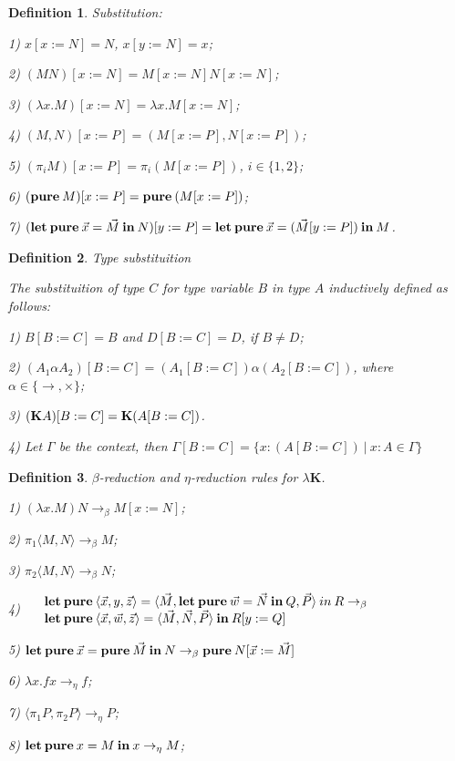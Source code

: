 \documentclass[a4paper]{article}
\newtheorem{defin}{Definition}
\begin{document}
  \begin{defin} Substitution:

  1) $x [x := N] = N$, $x [y := N] = x$;

  2) $(M N) [x := N] = M[x := N] N [x := N]$;

  3) $(\lambda x. M) [x := N] = \lambda x. M [x := N]$;

  4) $(M, N)[x := P] = (M[x := P], N [x := P])$;

  5) $(\pi_i M) [x := P] = \pi_i (M[x := P])$, $i \in \{ 1, 2\}$;

  6) $({\bf pure \: } M) [x := P] = {\bf pure \: } (M [x := P])$;

  7) $({\bf let \: pure \:}\vec{x} = \vec{M} {\: \bf in \:} N) [y := P] = {\bf let \: pure \:} \vec{x} = (\vec{M} [y := P]) {\: \bf in \:} M$.
  \end{defin}

  \begin{defin} Type substituition

    The substituition of type $C$ for type variable $B$ in type $A$ inductively defined as follows:

    1) $B [B := C] = B$ and $D [B := C] = D$, if $B \neq D$;

    2) $(A_1 \alpha A_2)[B := C] = (A_1[B := C]) \alpha (A_2[B := C])$, where $\alpha \in \{ \to, \times \}$;

    3) $({\bf K}A)[B := C] = {\bf K}(A [B := C])$.

    4) Let $\Gamma$ be the context, then $\Gamma [B := C] = \{ x : (A[B := C]) \: | \: x : A \in \Gamma \}$
  \end{defin}

  \begin{defin} $\beta$-reduction and $\eta$-reduction rules for \emph{$\lambda \textbf{K}$}.

  1) $(\lambda x. M) N \rightarrow_{\beta} M [x := N]$;

  2) $\pi_1 \langle M, N \rangle \rightarrow_{\beta} M$;

  3) $\pi_2 \langle M, N \rangle \rightarrow_{\beta} N$;

  4) $\begin{array}{llll}
  & {\bf let \: pure \:} \langle \vec{x}, y, \vec{z} \rangle = \langle \vec{M}, {\bf let \: pure \: } \vec{w} = \vec{N} {\bf \: in \: } Q, \vec{P} \rangle {\: in \:} R \rightarrow_{\beta} & \\
  & {\bf let \: pure \:} \langle \vec{x}, \vec{w}, \vec{z} \rangle = \langle \vec{M}, \vec{N}, \vec{P} \rangle \: { \bf in } \: R [y := Q]
  \end{array}$

  5) ${\bf let \: pure \:} \vec{x} = {\bf pure \:} \vec{M} {\: \bf in \:} N \rightarrow_{\beta} {\bf pure \:} N [\vec{x} := \vec{M}]$

  6) $\lambda x. f x \rightarrow_{\eta} f$;

  7) $\langle \pi_1 P, \pi_2 P \rangle \rightarrow_{\eta} P$;

  8) ${\bf let \: pure \:} x = M {\: \bf in \: } x \rightarrow_{\eta} M$;
  \end{defin}
\end{document}
